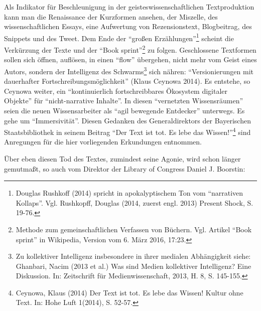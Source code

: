 \documentclass[a4paper,
fontsize=11pt,
oneside,
numbers=noperiodatend,
parskip=half-,
bibliography=totoc,
final
]{scrartcl}
\begin{document}
Als Indikator für Beschleunigung in der geisteswissenschaftlichen
Textproduktion kann man die Renaissance der Kurzformen ansehen, der
Miszelle, des wissenschaftlichen Essays, eine Aufwertung von
Rezensionstext, Blogbeitrag, des Snippets und des Tweet. Dem Ende der
\enquote{großen Erzählungen}\footnote{Douglas Rushkoff (2014) spricht in
  apokalyptischem Ton vom \enquote{narrativen Kollaps}. Vgl. Rushkopff,
  Douglas (2014, zuerst engl. 2013) Present Shock, S.\,19-76.} scheint
die Verkürzung der Texte und der \enquote{Book sprint}\footnote{Methode
  zum gemeinschaftlichen Verfassen von Büchern. Vgl. Artikel
  \enquote{Book sprint} in Wikipedia, Version vom 6. März 2016, 17:23.}
zu folgen. Geschlossene Textformen sollen sich öffnen, auflösen, in
einen \enquote{flow} übergehen, nicht mehr vom Geist eines Autors,
sondern der Intelligenz des Schwarms\footnote{Zu kollektiver Intelligenz
  insbesondere in ihrer medialen Abhängigkeit siehe: Ghanbari, Nacim
  (2013 et al.) Was sind Medien kollektiver Intelligenz? Eine
  Diskussion. In: Zeitschrift für Medienwissenschaft, 2013, H. 8, S.
  145-155.} sich nähren: \enquote{Versionierungen mit dauerhafter
Fortschreibungsmöglichkeit} (Klaus Ceynowa 2014). Es entstehe, so
Ceynowa weiter, ein \enquote{kontinuierlich fortschreibbares Ökosystem
digitaler Objekte} für \enquote{nicht-narrative Inhalte}. In diesen
\enquote{vernetzten Wissensräumen} seien die neuen Wissensarbeiter als
\enquote{agil bewegende Entdecker} unterwegs. Es gehe um
\enquote{Immersivität}. Diesen Gedanken des Generaldirektors der
Bayerischen Staatsbibliothek in seinem Beitrag \enquote{Der Text ist
tot. Es lebe das Wissen!}\footnote{Ceynowa, Klaus (2014) Der Text ist
  tot. Es lebe das Wissen! Kultur ohne Text. In: Hohe Luft 1(2014), S.
  52-57.} sind Anregungen für die hier vorliegenden Erkundungen
entnommen.

Über eben diesen Tod des Textes, zumindest seine Agonie, wird schon
länger gemutmaßt, so auch vom Direktor der Library of Congress Daniel J.
Boorstin:
\end{document}
